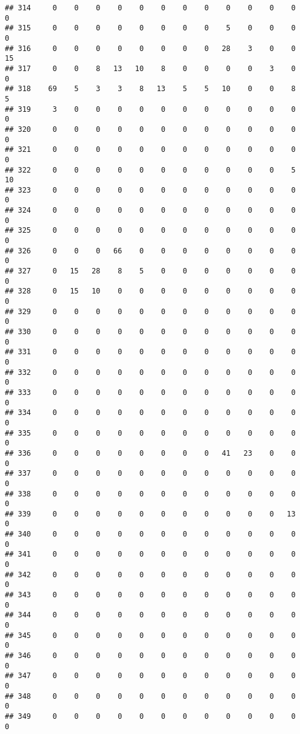 \documentclass[]{article}
\begin{document}
\begin{verbatim}
## 314     0    0    0    0    0    0    0    0    0    0    0    0    0
## 315     0    0    0    0    0    0    0    0    5    0    0    0    0
## 316     0    0    0    0    0    0    0    0   28    3    0    0   15
## 317     0    0    8   13   10    8    0    0    0    0    3    0    0
## 318    69    5    3    3    8   13    5    5   10    0    0    8    5
## 319     3    0    0    0    0    0    0    0    0    0    0    0    0
## 320     0    0    0    0    0    0    0    0    0    0    0    0    0
## 321     0    0    0    0    0    0    0    0    0    0    0    0    0
## 322     0    0    0    0    0    0    0    0    0    0    0    5   10
## 323     0    0    0    0    0    0    0    0    0    0    0    0    0
## 324     0    0    0    0    0    0    0    0    0    0    0    0    0
## 325     0    0    0    0    0    0    0    0    0    0    0    0    0
## 326     0    0    0   66    0    0    0    0    0    0    0    0    0
## 327     0   15   28    8    5    0    0    0    0    0    0    0    0
## 328     0   15   10    0    0    0    0    0    0    0    0    0    0
## 329     0    0    0    0    0    0    0    0    0    0    0    0    0
## 330     0    0    0    0    0    0    0    0    0    0    0    0    0
## 331     0    0    0    0    0    0    0    0    0    0    0    0    0
## 332     0    0    0    0    0    0    0    0    0    0    0    0    0
## 333     0    0    0    0    0    0    0    0    0    0    0    0    0
## 334     0    0    0    0    0    0    0    0    0    0    0    0    0
## 335     0    0    0    0    0    0    0    0    0    0    0    0    0
## 336     0    0    0    0    0    0    0    0   41   23    0    0    0
## 337     0    0    0    0    0    0    0    0    0    0    0    0    0
## 338     0    0    0    0    0    0    0    0    0    0    0    0    0
## 339     0    0    0    0    0    0    0    0    0    0    0   13    0
## 340     0    0    0    0    0    0    0    0    0    0    0    0    0
## 341     0    0    0    0    0    0    0    0    0    0    0    0    0
## 342     0    0    0    0    0    0    0    0    0    0    0    0    0
## 343     0    0    0    0    0    0    0    0    0    0    0    0    0
## 344     0    0    0    0    0    0    0    0    0    0    0    0    0
## 345     0    0    0    0    0    0    0    0    0    0    0    0    0
## 346     0    0    0    0    0    0    0    0    0    0    0    0    0
## 347     0    0    0    0    0    0    0    0    0    0    0    0    0
## 348     0    0    0    0    0    0    0    0    0    0    0    0    0
## 349     0    0    0    0    0    0    0    0    0    0    0    0    0

\end{verbatim}
\end{document}
